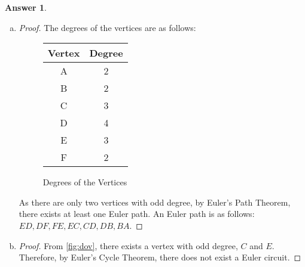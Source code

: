 \documentclass[article, 12pt]{article}
\theoremstyle{definition}
\newtheorem{answer}{Answer}
\begin{document}
    \begin{answer} \
        \begin{enumerate}[a)]
            \item \begin{proof}
                The degrees of the vertices are as follows:
                \begin{figure}[H]
                    \centering
                    \begin{tabular}{|c|c|}
                        \hline
                        Vertex & Degree \\
                        \hline
                        A & 2 \\
                        B & 2 \\
                        C & 3 \\
                        D & 4 \\
                        E & 3 \\
                        F & 2 \\
                        \hline
                    \end{tabular}
                    \caption{Degrees of the Vertices}
                    \label{fig:dov}
                \end{figure}
                As there are only two vertices with odd degree, by Euler's Path 
                Theorem, there exists at least one Euler path. An Euler path is as follows: $ED, DF, FE, EC, CD, DB, BA$. 
            \end{proof}
            \item \begin{proof}
                From \autoref{fig:dov}, there exists a vertex with odd degree, $C$ and $E$. Therefore, by Euler's Cycle Theorem, there does not exist a Euler circuit.  
            \end{proof}
        \end{enumerate}
    \end{answer}
\end{document}
